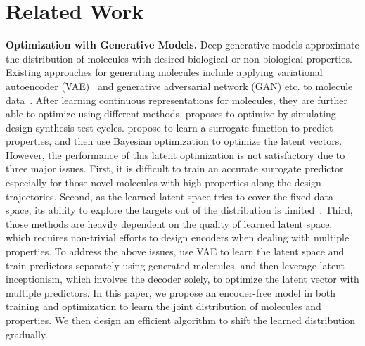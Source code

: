 \documentclass[accepted]{uai2023} %
\begin{document}
\section{Related Work}

\textbf{Optimization with Generative Models.}
Deep generative models approximate the distribution of molecules with desired biological or non-biological properties. Existing approaches for generating molecules include applying variational autoencoder (VAE)~\citep{kingma2013auto} and generative adversarial network (GAN) \citep{goodfellow2014generative} etc. to molecule data~\citep{gomez2018automatic,jin2018junction,de2018molgan,honda2019graph,madhawa2019graphnvp,shi2020graphaf,zang2020moflow,kotsias2020direct,chen2021molecule,fu2020core,liu2021graphebm,bagal2021liggpt,eckmann2022limo,segler2018generating}. After learning continuous representations for molecules, they are further able to optimize using different methods. \citep{segler2018generating} proposes to optimize by simulating design-synthesis-test cycles. \citep{gomez2018automatic, jin2018junction,eckmann2022limo} propose to learn a surrogate function to predict properties, and then use Bayesian optimization to optimize the latent vectors. However, the performance of this latent optimization is not satisfactory due to three major issues. First, it is difficult to train an accurate surrogate predictor especially for those novel molecules with high properties along the design trajectories. Second, as the learned latent space tries to cover the fixed data space, its ability to explore the targets out of the distribution is limited~\citep{guacamol,huang2021therapeutics}. Third, those methods are heavily dependent on the quality of learned latent space, which requires non-trivial efforts to design encoders when dealing with multiple properties. To address the above issues, \citep{eckmann2022limo} use VAE to learn the latent space and train predictors separately using generated molecules, and then leverage latent inceptionism, which involves the decoder solely, to optimize the latent vector with multiple predictors. In this paper, we propose an encoder-free model in both training and optimization to learn the joint distribution of molecules and properties. We then design an efficient algorithm to shift the learned distribution gradually. 
\end{document}
